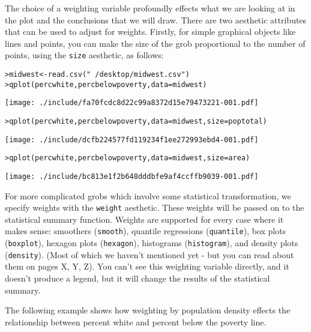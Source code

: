 \noindent The choice of a weighting variable profoundly effects what we are looking at in the plot and the conclusions that we will draw.  There are two aesthetic attributes that can be used to adjust for weights.  Firstly, for simple graphical objects like lines and points, you can make the size of the grob proportional to the number of points, using the {\tt size} aesthetic, as follows:

\begin{alltt}
> midwest <- read.csv("~/desktop/midwest.csv")
> qplot(percwhite, percbelowpoverty, data = midwest)
\end{alltt}
\texttt{[image: ./include/fa70fcdc8d22c99a8372d15e79473221-001.pdf]}
\begin{alltt}

> qplot(percwhite, percbelowpoverty, data = midwest, size = poptotal)
\end{alltt}
\texttt{[image: ./include/dcfb224577fd119234f1ee272993ebd4-001.pdf]}
\begin{alltt}

> qplot(percwhite, percbelowpoverty, data = midwest, size = area)
\end{alltt}
\texttt{[image: ./include/bc813e1f2b648dddbfe9af4ccffb9039-001.pdf]}
\begin{alltt}

\end{alltt}

For more complicated grobs which involve some statistical transformation, we specify weights with the {\tt weight} aesthetic.  These weights will be passed on to the statistical summary function.  Weights are supported for every case where it makes sense: smoothers ({\tt smooth}), quantile regressions ({\tt quantile}), box plots ({\tt boxplot}), hexagon plots ({\tt hexagon}), histograms ({\tt histogram}), and density plots ({\tt density}).  (Most of which we haven't mentioned yet - but you can read about them on pages X, Y, Z).  You can't see this weighting variable directly, and it doesn't produce a legend, but it will change the results of the statistical summary.

The following example shows how weighting by population density effects the relationship between percent white and percent below the poverty line.

